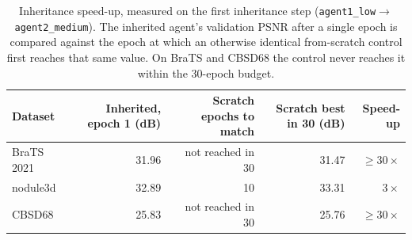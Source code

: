 \begin{table}[!t]
\centering
\caption{Inheritance speed-up, measured on the first inheritance step (\texttt{agent1\_low}$\rightarrow$\texttt{agent2\_medium}). The inherited agent's validation PSNR after a single epoch is compared against the epoch at which an otherwise identical from-scratch control first reaches that same value. On BraTS and CBSD68 the control never reaches it within the 30-epoch budget.}
\label{tab:speedup}
\begin{tabular}{lrrrr}
\toprule
Dataset & Inherited, epoch 1 (dB) & Scratch epochs to match & Scratch best in 30 (dB) & Speed-up \\
\midrule
BraTS 2021 & 31.96 & not reached in 30 & 31.47 & $\geq 30\times$ \\
nodule3d & 32.89 & 10 & 33.31 & $3\times$ \\
CBSD68 & 25.83 & not reached in 30 & 25.76 & $\geq 30\times$ \\
\bottomrule
\end{tabular}
\end{table}
